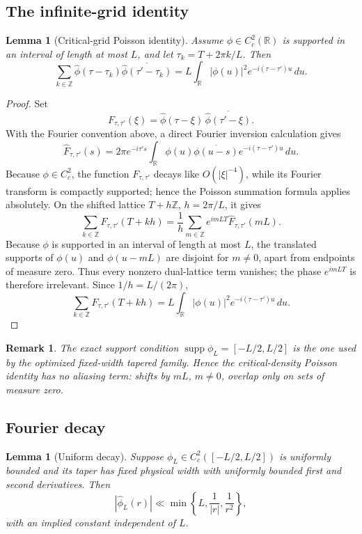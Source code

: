 \documentclass[11pt]{article}
\newtheorem{lemma}[theorem]{Lemma}
\newtheorem{remark}[theorem]{Remark}
\newcommand{\R}{\mathbb R}
\begin{document}
\subsection{The infinite-grid identity}

\begin{lemma}[Critical-grid Poisson identity]\label{aiv:lem:poisson}
Assume $\phi\in C_c^2(\R)$ is supported in an interval of length at most
$L$, and let $\tau_k=T+2\pi k/L$.  Then
\[
 \sum_{k\in\mathbb Z}
 \widehat\phi(\tau-\tau_k)
 \overline{\widehat\phi(\tau'-\tau_k)}
 =
 L\int_{\R}|\phi(u)|^2e^{-i(\tau-\tau')u}\,du .
\]
\end{lemma}

\begin{proof}
Set
\[
 F_{\tau,\tau'}(\xi)
 =
 \widehat\phi(\tau-\xi)\,
 \overline{\widehat\phi(\tau'-\xi)}.
\]
With the Fourier convention above, a direct Fourier inversion calculation
gives
\[
 \widehat F_{\tau,\tau'}(s)
 =
 2\pi e^{-i\tau' s}
 \int_{\R}\phi(u)\overline{\phi(u-s)}
 e^{-i(\tau-\tau')u}\,du.
\]
Because $\phi\in C_c^2$, the function $F_{\tau,\tau'}$ decays like
$O(|\xi|^{-4})$, while its Fourier transform is compactly supported; hence
the Poisson summation formula applies absolutely.  On the shifted lattice
$T+h\mathbb Z$, $h=2\pi/L$, it gives
\[
 \sum_{k\in\mathbb Z}F_{\tau,\tau'}(T+kh)
 =
 \frac1h\sum_{m\in\mathbb Z}
 e^{imLT}\widehat F_{\tau,\tau'}(mL).
\]
Because $\phi$ is supported in an interval of length at most $L$, the
translated supports of $\phi(u)$ and $\phi(u-mL)$ are disjoint for
$m\ne0$, apart from endpoints of measure zero.  Thus every nonzero
dual-lattice term vanishes; the phase $e^{imLT}$ is therefore irrelevant.
Since $1/h=L/(2\pi)$,
\[
 \sum_{k\in\mathbb Z}F_{\tau,\tau'}(T+kh)
 =
 L\int_{\R}|\phi(u)|^2e^{-i(\tau-\tau')u}\,du.
\]
\end{proof}

\begin{remark}
The exact support condition $\operatorname{supp}\phi_L=[-L/2,L/2]$ is the one used by the optimized fixed-width tapered family.  Hence the critical-density Poisson identity has no aliasing term: shifts by $mL$, $m\ne0$, overlap only on sets of measure zero.
\end{remark}

\subsection{Fourier decay}

\begin{lemma}[Uniform decay]\label{aiv:lem:decay}
Suppose $\phi_L\in C_c^2([-L/2,L/2])$ is uniformly bounded and its taper has fixed physical width with uniformly bounded first and second derivatives.  Then
\[
 |\widehat\phi_L(r)|
 \ll
 \min\left\{L,\frac1{|r|},\frac1{r^2}\right\},
\]
with an implied constant independent of $L$.
\end{lemma}
\end{document}
